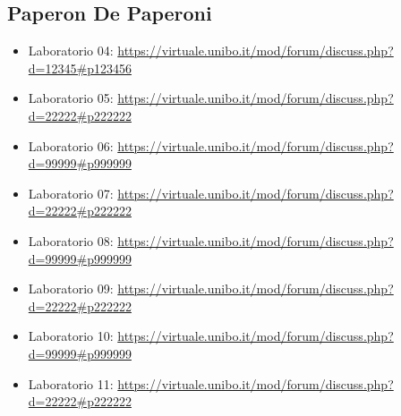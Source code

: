 \documentclass[a4paper,12pt]{report}
\begin{document}
\subsection{Paperon De Paperoni}

\begin{itemize}
 \item Laboratorio 04: \url{https://virtuale.unibo.it/mod/forum/discuss.php?d=12345#p123456}
 \item Laboratorio 05: \url{https://virtuale.unibo.it/mod/forum/discuss.php?d=22222#p222222}
 \item Laboratorio 06: \url{https://virtuale.unibo.it/mod/forum/discuss.php?d=99999#p999999}
 \item Laboratorio 07: \url{https://virtuale.unibo.it/mod/forum/discuss.php?d=22222#p222222}
 \item Laboratorio 08: \url{https://virtuale.unibo.it/mod/forum/discuss.php?d=99999#p999999}
 \item Laboratorio 09: \url{https://virtuale.unibo.it/mod/forum/discuss.php?d=22222#p222222}
 \item Laboratorio 10: \url{https://virtuale.unibo.it/mod/forum/discuss.php?d=99999#p999999}
 \item Laboratorio 11: \url{https://virtuale.unibo.it/mod/forum/discuss.php?d=22222#p222222}
\end{itemize}




\end{document}
